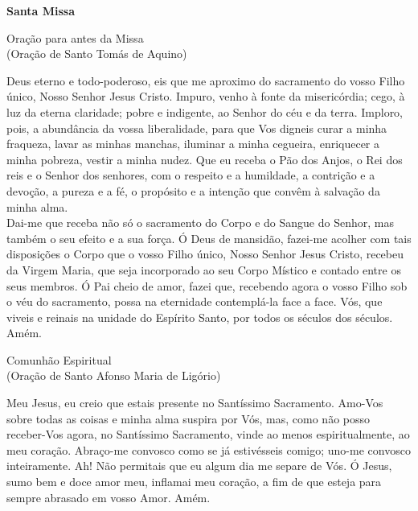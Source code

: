 \documentclass{book}
\begin{document}
\newpage
\begin{center}
    \textbf{Santa Missa}
\end{center}
\begin{center}
    Oração para antes da Missa \\ \textcolor{VioletRed2}{\scriptsize{(Oração de Santo Tomás de Aquino)}}
\end{center}
\begin{flushleft}
    Deus eterno e todo-poderoso, eis que me aproximo do sacramento do vosso Filho único, Nosso Senhor Jesus Cristo. Impuro, venho à fonte da misericórdia; cego, à luz da eterna claridade; pobre e indigente, ao Senhor do céu e da terra. Imploro, pois, a abundância da vossa liberalidade, para que Vos digneis curar a minha fraqueza, lavar as minhas manchas, iluminar a minha cegueira, enriquecer a minha pobreza, vestir a minha nudez. Que eu receba o Pão dos Anjos, o Rei dos reis e o Senhor dos senhores, com o respeito e a humildade, a contrição e a devoção, a pureza e a fé, o propósito e a intenção que convêm à salvação da minha alma.
    \vspace{.2cm} \\
    Dai-me que receba não só o sacramento do Corpo e do Sangue do Senhor, mas também o seu efeito e a sua força. Ó Deus de mansidão, fazei-me acolher com tais disposições o Corpo que o vosso Filho único, Nosso Senhor Jesus Cristo, recebeu da Virgem Maria, que seja incorporado ao seu Corpo Místico e contado entre os seus membros. Ó Pai cheio de amor, fazei que, recebendo agora o vosso Filho sob o véu do sacramento, possa na eternidade contemplá-la face a face. Vós, que viveis e reinais na unidade do Espírito Santo, por todos os séculos dos séculos. Amém.
\end{flushleft}
\begin{center}
    Comunhão Espiritual \\ \textcolor{VioletRed2}{\scriptsize{(Oração de Santo Afonso Maria de Ligório)}}
\end{center}
\begin{flushleft}
    Meu Jesus, eu creio que estais presente no Santíssimo Sacramento. Amo-Vos sobre todas as coisas e minha alma suspira por Vós, mas, como não posso receber-Vos agora, no Santíssimo Sacramento, vinde ao menos espiritualmente, ao meu coração. Abraço-me convosco como se já estivésseis comigo; uno-me convosco inteiramente. Ah! Não permitais que eu algum dia me separe de Vós. Ó Jesus, sumo bem e doce amor meu, inflamai meu coração, a fim de que esteja para sempre abrasado em vosso Amor. Amém.
\end{flushleft}
\end{document}
